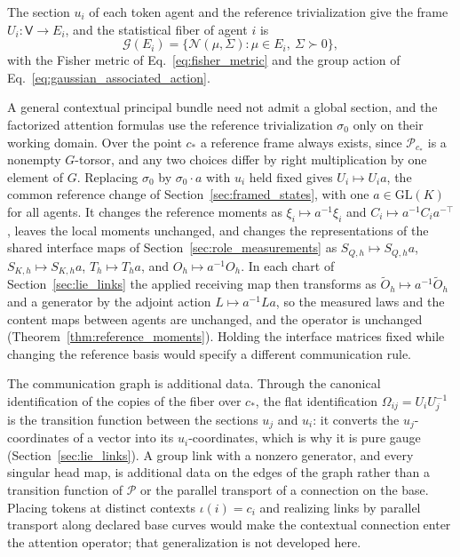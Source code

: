 \documentclass[twoside,11pt]{article}
\begin{document}
The section \(u_i\) of each token agent and the reference trivialization give the frame \(U_i:\mathsf V\to E_i\), and the statistical fiber of agent \(i\) is
\begin{equation}
\mathcal G(E_i)=\{\mathcal N(\mu,\Sigma):\mu\in E_i,\ \Sigma\succ0\},
\label{eq:overview_statistical_fiber}
\end{equation}
with the Fisher metric of Eq.~\eqref{eq:fisher_metric} and the group action of Eq.~\eqref{eq:gaussian_associated_action}.

A general contextual principal bundle need not admit a global section, and the factorized attention formulas use the reference trivialization \(\sigma_0\) only on their working domain. Over the point \(c_*\) a reference frame always exists, since \(\mathcal P_{c_*}\) is a nonempty \(G\)-torsor, and any two choices differ by right multiplication by one element of \(G\). Replacing \(\sigma_0\) by \(\sigma_0\cdot a\) with \(u_i\) held fixed gives \(U_i\mapsto U_ia\), the common reference change of Section~\ref{sec:framed_states}, with one \(a\in\mathrm{GL}(K)\) for all agents. It changes the reference moments as \(\xi_i\mapsto a^{-1}\xi_i\) and \(C_i\mapsto a^{-1}C_ia^{-\top}\), leaves the local moments unchanged, and changes the representations of the shared interface maps of Section~\ref{sec:role_measurements} as \(S_{Q,h}\mapsto S_{Q,h}a\), \(S_{K,h}\mapsto S_{K,h}a\), \(T_h\mapsto T_ha\), and \(O_h\mapsto a^{-1}O_h\). In each chart of Section~\ref{sec:lie_links} the applied receiving map then transforms as \(\widetilde O_h\mapsto a^{-1}\widetilde O_h\) and a generator by the adjoint action \(L\mapsto a^{-1}La\), so the measured laws and the content maps between agents are unchanged, and the operator is unchanged (Theorem~\ref{thm:reference_moments}). Holding the interface matrices fixed while changing the reference basis would specify a different communication rule.

The communication graph is additional data. Through the canonical identification of the copies of the fiber over \(c_*\), the flat identification \(\Omega_{ij}=U_iU_j^{-1}\) is the transition function between the sections \(u_j\) and \(u_i\): it converts the \(u_j\)-coordinates of a vector into its \(u_i\)-coordinates, which is why it is pure gauge (Section~\ref{sec:lie_links}). A group link with a nonzero generator, and every singular head map, is additional data on the edges of the graph rather than a transition function of \(\mathcal P\) or the parallel transport of a connection on the base. Placing tokens at distinct contexts \(\iota(i)=c_i\) and realizing links by parallel transport along declared base curves would make the contextual connection enter the attention operator; that generalization is not developed here.
\end{document}
